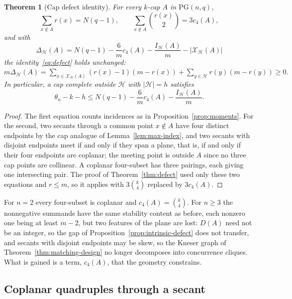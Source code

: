 \documentclass[11pt]{article}
\newtheorem{theorem}{Theorem}[section]
\theoremstyle{definition}
\theoremstyle{remark}
\newcommand{\PG}{\mathrm{PG}}
\newcommand{\cH}{\mathcal{H}}
\newcommand{\cX}{\mathcal{X}}
\newcommand{\IH}{I_{\cH}}
\begin{document}
\begin{theorem}[Cap defect identity]
\label{thm:cap-defect-identity}
For every $k$-cap $A$ in $\PG(n,q)$,
\[
 \sum_{x\notin A}r(x)=N(q-1),
 \qquad
 \sum_{x\notin A}\binom{r(x)}2=3c_4(A),
\]
and with
\[
 \Delta_{\cH}(A)=N(q-1)-\frac6m c_4(A)-\frac{\IH(A)}m-|\cX_{\cH}(A)|
\]
the identity~\eqref{eq:defect} holds unchanged:
\(
 m\Delta_{\cH}(A)=\sum_{x\in\cX_{\cH}(A)}(r(x)-1)(m-r(x))
 +\sum_{y\in\cH}r(y)(m-r(y))\ge0.
\)
In particular, a cap complete outside $\cH$ with $|\cH|=h$ satisfies
\begin{equation}
 \theta_n-k-h\le N(q-1)-\frac6m c_4(A)-\frac{\IH(A)}m.
\label{eq:cap-arbitrary-holes}
\end{equation}
\end{theorem}

\begin{proof}
The first equation counts incidences as in Proposition~\ref{prop:moments}.
For the second, two secants through a common point $x\notin A$ have four
distinct endpoints by the cap analogue of Lemma~\ref{lem:max-index}, and
two secants with disjoint endpoints meet if and only if they span a plane,
that is, if and only if their four endpoints are coplanar; the meeting
point is outside $A$ since no three cap points are collinear.  A coplanar
four-subset has three pairings, each giving one intersecting pair.  The
proof of Theorem~\ref{thm:defect} used only these two equations and
$r\le m$, so it applies with $3\binom{k}{4}$ replaced by $3c_4(A)$.
\end{proof}

For $n=2$ every four-subset is coplanar and $c_4(A)=\binom{k}{4}$.  For
$n\ge3$ the nonnegative summands have the same stability content as
before, each nonzero one being at least $m-2$, but two features of the
plane are lost: $D(A)$ need not be an integer, so the gap of
Proposition~\ref{prop:intrinsic-defect} does not transfer, and secants with
disjoint endpoints may be skew, so the Kneser graph of
Theorem~\ref{thm:matching-design} no longer decomposes into concurrence
cliques.  What is gained is a term, $c_4(A)$, that the geometry constrains.

\subsection{Coplanar quadruples through a secant}
\end{document}
